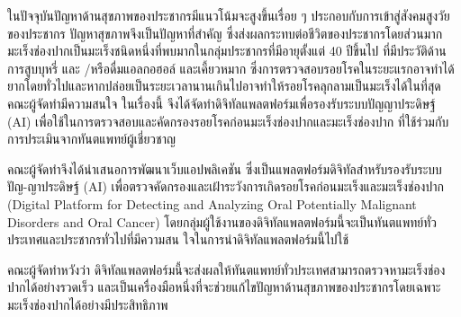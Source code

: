 \maketitle
\makesignature

\ifproject
\begin{abstractTH}

ในปัจจุบันปัญหาด้านสุขภาพของประชากรมีแนวโน้มจะสูงขึ้นเรื่อย ๆ ประกอบกับการเข้าสู่สังคมสูงวัยของประชากร ปัญหาสุขภาพจึงเป็นปัญหาที่สำคัญ ซึ่งส่งผลกระทบต่อชีวิตของประชากรโดยส่วนมาก มะเร็งช่องปากเป็นมะเร็งชนิดหนึ่งที่พบมากในกลุ่มประชากรที่มีอายุตั้งแต่ 40 ปีขึ้นไป ที่มีประวัติด้านการสูบบุหรี่ และ
/หรือดื่มแอลกอฮอล์ และเคี้ยวหมาก ซึ่งการตรวจสอบรอยโรคในระยะแรกอาจทำได้ยากโดยทั่วไปและหากปล่อยเป็นระยะเวลานานเกินไปอาจทำให้รอยโรคลุกลามเป็นมะเร็งได้ในที่สุด คณะผู้จัดทำมีความสนใจ
ในเรื่องนี้ จึงได้จัดทำดิจิทัลแพลตฟอร์มเพื่อรองรับระบบปัญญาประดิษฐ์ (AI) เพื่อใช้ในการตรวจสอบและคัดกรองรอยโรคก่อนมะเร็งช่องปากและมะเร็งช่องปาก ที่ใช้ร่วมกับการประเมินจากทันตแพทย์ผู้เชี่ยวชาญ

คณะผู้จัดทำจึงได้นำเสนอการพัฒนาเว็บแอปพลิเคชัน ซึ่งเป็นแพลตฟอร์มดิจิทัลสำหรับรองรับระบบปัญ-ญาประดิษฐ์ (AI) เพื่อตรวจคัดกรองและเฝ้าระวังการเกิดรอยโรคก่อนมะเร็งและมะเร็งช่องปาก (Digital Platform for Detecting and Analyzing Oral Potentially Malignant Disorders and Oral Cancer) โดยกลุ่มผู้ใช้งานของดิจิทัลแพลตฟอร์มนี้จะเป็นทันตแพทย์ทั่วประเทศและประชากรทั่วไปที่มีความสน ใจในการนำดิจิทัลแพลตฟอร์มนี้ไปใช้

คณะผู้จัดทำหวังว่า ดิจิทัลแพลตฟอร์มนี้จะส่งผลให้ทันตแพทย์ทั่วประเทศสามารถตรวจหามะเร็งช่องปากได้อย่างรวดเร็ว และเป็นเครื่องมือหนึ่งที่จะช่วยแก้ไขปัญหาด้านสุขภาพของประชากรโดยเฉพาะมะเร็งช่องปากได้อย่างมีประสิทธิภาพ
\end{abstractTH}

